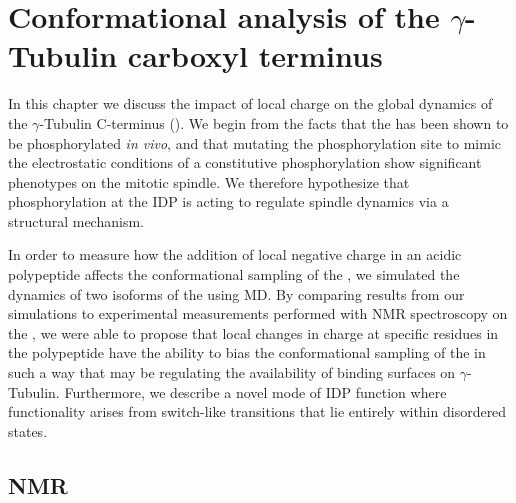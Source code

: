 \chapter{Conformational analysis of the $\gamma$-Tubulin carboxyl terminus}

In this chapter we discuss the impact of local charge on the global dynamics of the $\gamma$-Tubulin C-terminus (\gct{}). We begin from the facts that the \gct{} has been shown to be phosphorylated {\it in vivo}, and that mutating the phosphorylation site to mimic the electrostatic conditions of a constitutive phosphorylation show significant phenotypes on the mitotic spindle. We therefore hypothesize that phosphorylation at the \gct{} IDP is acting to regulate spindle dynamics via a structural mechanism.

In order to measure how the addition of local negative charge in an acidic polypeptide affects the conformational sampling of the \gct{}, we simulated the dynamics of two isoforms of the \gct{} using MD. By comparing results from our simulations to experimental measurements performed with NMR spectroscopy on the \gct{}, we were able to propose that local changes in charge at specific residues in the polypeptide have the ability to bias the conformational sampling of the \gct{} in such a way that may be regulating the availability of binding surfaces on $\gamma$-Tubulin. Furthermore, we describe a novel mode of IDP function where functionality arises from switch-like transitions that lie entirely within disordered states.

\section{NMR}


